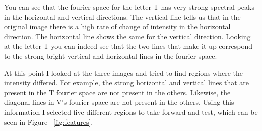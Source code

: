 \documentclass[11pt, a4paper]{article}
\begin{document}
You can see that the fourier space for the letter T has very strong spectral peaks in the horizontal and vertical directions. The vertical line tells us that in the original image there is a high rate of change of intensity in the horizontal direction. The horizontal line shows the same for the vertical direction. Looking at the letter T you can indeed see that the two lines that make it up correspond to the strong bright vertical and horizontal lines in the fourier space. 

At this point I looked at the three images and tried to find regions where the intensity differed. For example, the strong horizontal and vertical lines that are present in the T fourier space are not present in the others. Likewise, the diagonal lines in V's fourier space are not present in the others. Using this information I selected five different regions to take forward and test, which can be seen in Figure ~\ref{fig:features}.
\end{document}
